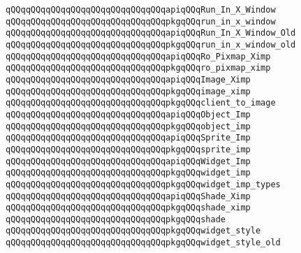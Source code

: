 \newline
\verb|qQQqqQQqqQQqqQQqqQQqqQQqqQQqqQQqapiqQQqRun_In_X_Window|\newline
\verb|qQQqqQQqqQQqqQQqqQQqqQQqqQQqqQQqpkgqQQqrun_in_x_window|\newline
\newline
\verb|qQQqqQQqqQQqqQQqqQQqqQQqqQQqqQQqapiqQQqRun_In_X_Window_Old|\newline
\verb|qQQqqQQqqQQqqQQqqQQqqQQqqQQqqQQqpkgqQQqrun_in_x_window_old|\newline
\newline
\verb|qQQqqQQqqQQqqQQqqQQqqQQqqQQqqQQqapiqQQqRo_Pixmap_Ximp|\newline
\verb|qQQqqQQqqQQqqQQqqQQqqQQqqQQqqQQqpkgqQQqro_pixmap_ximp|\newline
\newline
\verb|qQQqqQQqqQQqqQQqqQQqqQQqqQQqqQQqapiqQQqImage_Ximp|\newline
\verb|qQQqqQQqqQQqqQQqqQQqqQQqqQQqqQQqpkgqQQqimage_ximp|\newline
\verb|qQQqqQQqqQQqqQQqqQQqqQQqqQQqqQQqpkgqQQqclient_to_image|\newline
\newline
\verb|qQQqqQQqqQQqqQQqqQQqqQQqqQQqqQQqapiqQQqObject_Imp|\newline
\verb|qQQqqQQqqQQqqQQqqQQqqQQqqQQqqQQqpkgqQQqobject_imp|\newline
\newline
\verb|qQQqqQQqqQQqqQQqqQQqqQQqqQQqqQQqapiqQQqSprite_Imp|\newline
\verb|qQQqqQQqqQQqqQQqqQQqqQQqqQQqqQQqpkgqQQqsprite_imp|\newline
\newline
\verb|qQQqqQQqqQQqqQQqqQQqqQQqqQQqqQQqapiqQQqWidget_Imp|\newline
\verb|qQQqqQQqqQQqqQQqqQQqqQQqqQQqqQQqpkgqQQqwidget_imp|\newline
\verb|qQQqqQQqqQQqqQQqqQQqqQQqqQQqqQQqpkgqQQqwidget_imp_types|\newline
\newline
\verb|qQQqqQQqqQQqqQQqqQQqqQQqqQQqqQQqapiqQQqShade_Ximp|\newline
\verb|qQQqqQQqqQQqqQQqqQQqqQQqqQQqqQQqpkgqQQqshade_ximp|\newline
\verb|qQQqqQQqqQQqqQQqqQQqqQQqqQQqqQQqpkgqQQqshade|\newline
\newline
\verb|qQQqqQQqqQQqqQQqqQQqqQQqqQQqqQQqpkgqQQqwidget_style|\newline
\verb|qQQqqQQqqQQqqQQqqQQqqQQqqQQqqQQqpkgqQQqwidget_style_old|\newline
